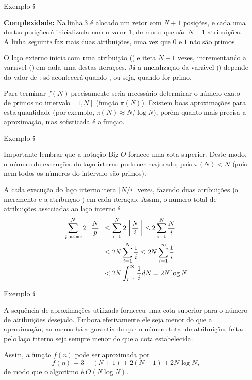 \begin{frame}[fragile]{Exemplo 6}

    \textbf{Complexidade:} Na linha 3 é alocado um vetor com $N + 1$ posições, e cada uma
        destas posições é inicializada com o valor $1$, de modo que são $N + 1$ atribuições. A
        linha seguinte faz mais duas atribuições, uma vez que $0$ e $1$ não são primos.

        O laço externo inicia com uma atribuição () e itera $N - 1$ vezes,
        incrementando a variável  () em cada uma destas iterações. Já
        a inicialização da variável  () depende do valor de 
        : só acontecerá quando , ou seja, quando 
        for primo.

        Para terminar $f(N)$ precisamente seria necessário determinar o número exato de primos no
        intervalo $[1, N]$ (função $\pi(N)$). Existem boas aproximações para esta quantidade 
        (por exemplo,
            $\pi(N) \approx N/\log N$), porém quanto mais precisa a aproximação, mas sofisticada é a
            função.
\end{frame}

\begin{frame}[fragile]{Exemplo 6}

    Importante lembrar que a notação Big-$O$ fornece uma cota superior.
    Deste modo, o número de execuções do laço interno pode ser majorado, pois $\pi(N) < N$ 
    (pois nem todos os números do intervalo são primos).

    A cada execução do laço interno itera $\lfloor N/i\rfloor$ vezes, fazendo duas atribuições
    (o incremento  e a atribuição ) em cada iteração. Assim,
    o número total de atribuições associadas ao laço interno é
    \begin{align*}
        \sum_{p\ \mbox{\tiny primo} }^N 2\left\lfloor \frac{N}{p}\right\rfloor 
        &\leq  \sum_{i = 1}^N 2\left\lfloor \frac{N}{i}\right\rfloor 
        \leq  2\sum_{i = 1}^N \frac{N}{i} \\
        &\leq  2N\sum_{i = 1}^N \frac{1}{i}
        \leq  2N\sum_{i = 1}^\infty \frac{1}{i} \\
        &<  2N\int_{i = 1}^\infty \frac{1}{i} dN = 2N\log N
    \end{align*}
\end{frame}

\begin{frame}[fragile]{Exemplo 6}

    A sequência de aproximações utilizada forneceu uma cota superior para o número de atribuições
    desejado. Embora efetivamente ele seja menor do que a aproximação, ao menos há a garantia
    de que o número total de atribuições feitas pelo laço interno seja sempre menor do que a 
    cota estabelecida.

    Assim, a função $f(n)$ pode ser aproximada por
    \[
        f(n) = 3 + (N + 1) + 2(N - 1) + 2N\log N,
    \]
    de modo que o algoritmo é $O(N\log N)$.

\end{frame}

